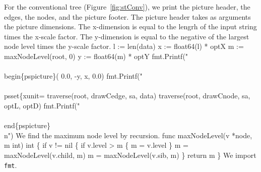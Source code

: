 For the conventional tree (Figure~\ref{fig:stConv}), we print the
picture header, the edges, the nodes, and the picture footer. The
picture header takes as arguments the picture dimensions. The
x-dimension is equal to the lengrh of the input string times the
x-scale factor. The y-dimension is equal to the negative of the
largest node level times the y-scale factor.
\nwenddocs{}\endmoddef\nwstartdeflinemarkup{}\nwenddeflinemarkup
l := len(data)
x := float64(l) * optX
m := maxNodeLevel(root, 0)
y := float64(m) * optY
fmt.Printf("\\\\begin\{pspicture\}(%
          0.0, -y, x, 0.0)
fmt.Printf("\\\\psset\{xunit=%
traverse(root, drawCedge, sa, data)
traverse(root, drawCnode, sa, optL, optD)
fmt.Printf("\\\\end\{pspicture\}\\n")
\nwendcode{}\nwdocspar
We find the maximum node level by recursion.
\nwenddocs{}\plusendmoddef\nwstartdeflinemarkup{}\nwenddeflinemarkup
func maxNodeLevel(v *node, m int) int \{
          if v != nil \{
                  if v.level > m \{
                          m = v.level
                  \}
                  m = maxNodeLevel(v.child, m)
                  m = maxNodeLevel(v.sib, m)
          \}
          return m
\}
\nwendcode{}\nwdocspar
We import \texttt{fmt}.
\nwenddocs{}\plusendmoddef\nwstartdeflinemarkup{}\nwenddeflinemarkup
